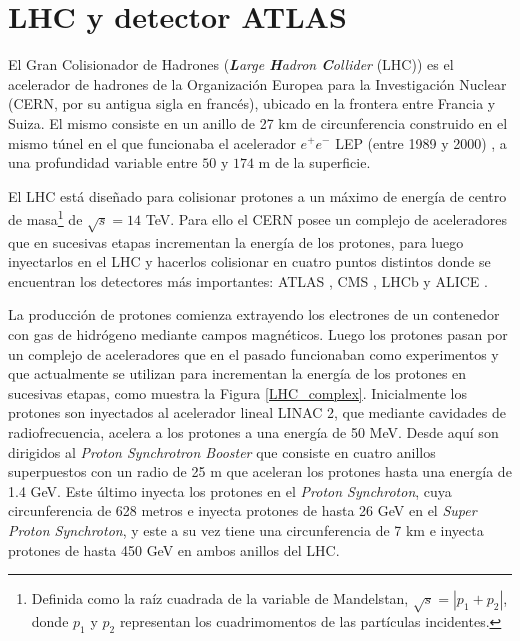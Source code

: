 \chapter{LHC y detector ATLAS}







El Gran Colisionador de Hadrones (\textit{\textbf{L}arge \textbf{H}adron \textbf{C}ollider} (LHC)) \cite{Evans:1129806} es el acelerador de hadrones de la Organización Europea para la Investigación Nuclear (CERN, por su antigua sigla en francés), ubicado en la frontera entre Francia y Suiza. El mismo consiste en un anillo de 27 km de circunferencia construido en el mismo túnel en el que funcionaba el acelerador $e^{+}e^{-}$ LEP (entre 1989 y 2000) \cite{LEPbook}, a una profundidad variable entre $50$ y $174$ m de la superficie.

El LHC está diseñado para colisionar protones a un máximo de energía de centro de masa\footnote{Definida como la raíz cuadrada de la variable de Mandelstan, $\sqrt{s}=|p_1+p_2|$, donde $p_1$ y $p_2$ representan los cuadrimomentos de las partículas incidentes.} de $\sqrt{s}=14$ TeV. Para ello el CERN posee un complejo de aceleradores que en sucesivas etapas incrementan la energía de los protones, para luego inyectarlos en el LHC y hacerlos colisionar en cuatro puntos distintos donde se encuentran los detectores más importantes: ATLAS \cite{PERF-2007-01}, CMS \cite{CMS}, LHCb \cite{LHCb} y ALICE \cite{ALICE}.

La producción de protones comienza extrayendo los electrones de un contenedor con gas de hidrógeno mediante campos magnéticos. Luego los protones pasan por un complejo de aceleradores que en el pasado funcionaban como experimentos y que actualmente se utilizan para incrementan la energía de los protones en sucesivas etapas, como muestra la Figura \ref{LHC_complex}. Inicialmente los protones son inyectados al acelerador lineal LINAC 2, que mediante cavidades de radiofrecuencia, acelera a los protones a una energía de 50 MeV. Desde aquí son dirigidos al \textit{Proton Synchrotron Booster} que consiste en cuatro anillos superpuestos con un radio de 25 m que aceleran los protones hasta una energía de 1.4 GeV. Este último inyecta los protones en el \textit{Proton Synchroton}, cuya circunferencia de 628 metros e inyecta protones de hasta 26 GeV en el \textit{Super Proton Synchroton}, y este a su vez tiene una circunferencia de 7 km e inyecta protones de hasta 450 GeV en ambos anillos del LHC. 

